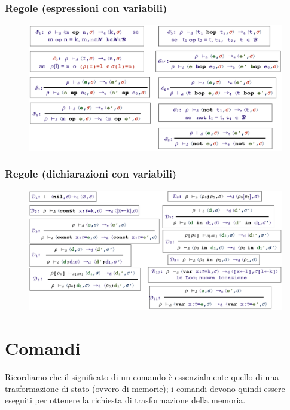 \documentclass[a4paper,oneside,titlepage]{book}
\begin{document}
\subsection{Regole (espressioni con variabili)}
\begin{figure}[htp]
	\centering
	\includegraphics[width=\textwidth, height=\textheight, keepaspectratio]{expRegole5.png}
\end{figure}

\subsection{Regole (dichiarazioni con variabili)}
\label{sec:decSemDin2}
\begin{figure}[htp]
	\centering
	\includegraphics[width=\textwidth, height=\textheight, keepaspectratio]{decRegole3.png}
\end{figure}


\chapter{Comandi}
Ricordiamo che il significato di un comando è essenzialmente quello di una trasformazione di stato (ovvero di memorie); i comandi devono quindi essere eseguiti per ottenere la richiesta di trasformazione della memoria.
\end{document}
